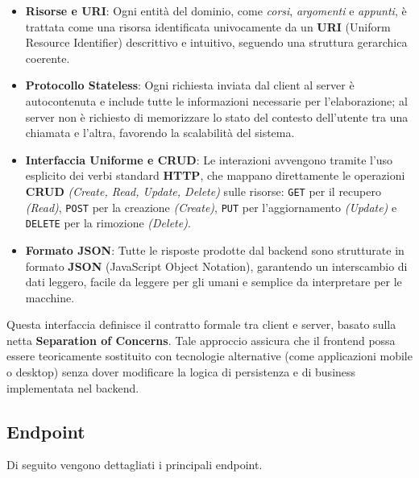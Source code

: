 \begin{itemize}
    \item \textbf{Risorse e URI}: Ogni entità del dominio, come \textit{corsi}, \textit{argomenti} e \textit{appunti}, è trattata come una risorsa identificata univocamente da un \textbf{URI} (Uniform Resource Identifier) descrittivo e intuitivo, seguendo una struttura gerarchica coerente.
    
    \item \textbf{Protocollo Stateless}: Ogni richiesta inviata dal client al server è autocontenuta e include tutte le informazioni necessarie per l'elaborazione; al server non è richiesto di memorizzare lo stato del contesto dell'utente tra una chiamata e l'altra, favorendo la scalabilità del sistema.
    
    \item \textbf{Interfaccia Uniforme e CRUD}: Le interazioni avvengono tramite l'uso esplicito dei verbi standard \textbf{HTTP}, che mappano direttamente le operazioni \textbf{CRUD} \textit{(Create, Read, Update, Delete)} sulle risorse: \texttt{GET} per il recupero \textit{(Read)}, \texttt{POST} per la creazione \textit{(Create)}, \texttt{PUT} per l'aggiornamento \textit{(Update)} e \texttt{DELETE} per la rimozione \textit{(Delete)}.
    
    \item \textbf{Formato JSON}: Tutte le risposte prodotte dal backend sono strutturate in formato \textbf{JSON} (JavaScript Object Notation), garantendo un interscambio di dati leggero, facile da leggere per gli umani e semplice da interpretare per le macchine.
\end{itemize}

\noindent Questa interfaccia definisce il contratto formale tra client e server, basato sulla netta \textbf{Separation of Concerns}. Tale approccio assicura che il frontend possa essere teoricamente sostituito con tecnologie alternative (come applicazioni mobile o desktop) senza dover modificare la logica di persistenza e di business implementata nel backend.

\subsection{Endpoint}
Di seguito vengono dettagliati i principali endpoint.

